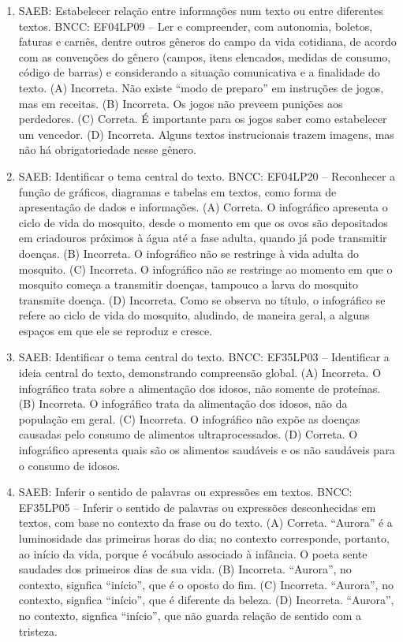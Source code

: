 \begin{enumerate}
\item
SAEB: Estabelecer relação entre informações num texto ou entre diferentes textos. BNCC: EF04LP09 -- Ler e compreender, com autonomia, boletos, faturas e carnês, dentre outros gêneros do campo da vida cotidiana, de acordo com as convenções do gênero (campos, itens elencados, medidas de consumo, código de barras) e considerando a situação comunicativa e a finalidade do texto. 
(A) Incorreta. Não existe ``modo de preparo'' em instruções de jogos, mas em receitas. 
(B) Incorreta. Os jogos não preveem punições aos perdedores. 
(C) Correta. É importante para os jogos saber como estabelecer um vencedor. 
(D) Incorreta. Alguns textos instrucionais trazem imagens, mas não há obrigatoriedade nesse gênero.

\item
SAEB: Identificar o tema central do texto. BNCC: EF04LP20 -- Reconhecer a função de gráficos, diagramas e tabelas em textos, como forma de apresentação de dados e informações. 
(A) Correta. O infográfico apresenta o ciclo de vida do mosquito, desde o momento em que os ovos são depositados em criadouros próximos à água até a fase adulta, quando já pode transmitir doenças. 
(B) Incorreta. O infográfico não se restringe à vida adulta do mosquito. 
(C) Incorreta. O infográfico não se restringe ao momento em que o mosquito começa a transmitir doenças, tampouco a larva do mosquito transmite doença. 
(D) Incorreta. Como se observa no título, o infográfico se refere ao ciclo de vida do mosquito, aludindo, de maneira geral, a alguns espaços em que ele se reproduz e cresce.

\item
SAEB: Identificar o tema central do texto. BNCC: EF35LP03 -- Identificar a ideia central do texto, demonstrando compreensão global. 
(A) Incorreta. O infográfico trata sobre a alimentação dos idosos, não somente de proteínas. 
(B) Incorreta. O infográfico trata da alimentação dos idosos, não da população em geral. 
(C) Incorreta. O infográfico não expõe as doenças causadas pelo consumo de alimentos ultraprocessados. 
(D) Correta. O infográfico apresenta quais são os alimentos saudáveis e os não saudáveis para o consumo de idosos.

\item
SAEB: Inferir o sentido de palavras ou expressões em textos. BNCC: EF35LP05 -- Inferir o sentido de palavras ou expressões desconhecidas em textos, com base no contexto da frase ou do texto. 
(A) Correta. ``Aurora'' é a luminosidade das primeiras horas do dia; no contexto corresponde, portanto, ao início da vida, porque é vocábulo associado à infância. O poeta sente saudades dos primeiros dias de sua vida. 
(B) Incorreta. ``Aurora'', no contexto, signfica ``início'', que é o oposto do fim. 
(C) Incorreta.  ``Aurora'', no contexto, signfica ``início'', que é diferente da beleza. 
(D) Incorreta. ``Aurora'', no contexto, signfica ``início'', que não guarda relação de sentido com a tristeza.


\end{enumerate}
